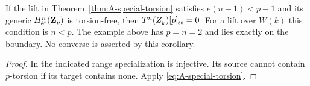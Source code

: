 \begin{corollary}\label{cor:A-lifting-small-range}
 If the lift in
Theorem~\ref{thm:A-special-torsion} satisfies $e(n-1)<p-1$ and its
generic $H^n_{\et}(\Zp)$ is torsion-free, then
$T^n(Z_{\bar k})[p]_{\ss}=0$.  For a lift over $W(k)$ this condition
is $n<p$.  The example above has $p=n=2$ and lies exactly on the
boundary.  No converse is asserted by this corollary.
\end{corollary}
\begin{proof}
In the indicated range specialization is injective.  Its source
cannot contain $p$-torsion if its target contains none.  Apply
\eqref{eq:A-special-torsion}.
\end{proof}
